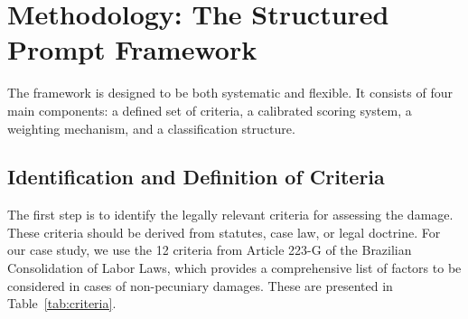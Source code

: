 \documentclass[11pt,a4paper]{article}
\begin{document}
\section{Methodology: The Structured Prompt Framework}

The framework is designed to be both systematic and flexible. It consists of four main components: a defined set of criteria, a calibrated scoring system, a weighting mechanism, and a classification structure.

\subsection{Identification and Definition of Criteria}

The first step is to identify the legally relevant criteria for assessing the damage. These criteria should be derived from statutes, case law, or legal doctrine. For our case study, we use the 12 criteria from Article 223-G of the Brazilian Consolidation of Labor Laws, which provides a comprehensive list of factors to be considered in cases of non-pecuniary damages. These are presented in Table~\ref{tab:criteria}.
\end{document}
